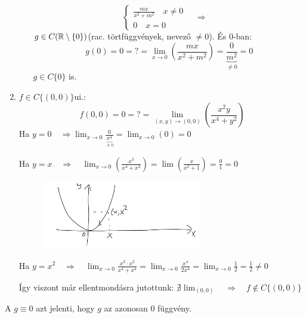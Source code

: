\documentclass[a4paper,11.5pt]{article}
\begin{document}
\begin{task}
\begin{enumerate}
\begin{enumerate}
\[\begin{cases}
					\frac{mx}{x^2+m^2}\quad x\not=0\\
					0\quad x=0
				\end{cases}\quad \Rightarrow\quad   \]
				$g\in C(\mathbb{R}\setminus\{0\})$\quad (rac. törtfüggvények, nevező $\not=0$). És 0-ban:
				\[ g(0)=0=?=\lim_{x\to0}\left(\frac{mx}{x^2+m^2}\right)=\frac{0}{\underbrace{m^2}_{\not=0}}=0 \]
				$g\in C\{0\}$ is.
			\end{enumerate}
			\item $f\in C\{ (0,0) \}$\quad ui.:
			\[ f(0,0)=0=?=\lim_{(x,y)\to(0,0)}\left(\frac{x^2y}{x^4+y^2}\right) \]
			Ha $\displaystyle y=0\quad \Rightarrow\lim_{x\to0}\frac{0}{\underbrace{x^4}_{\not=0}}=\lim_{x\to0}(0)=0$
			
			Ha $\displaystyle y=x\quad \Rightarrow\quad \lim_{x\to0}\left(\frac{x^3}{x^4+x^2}\right)=\lim\left(\frac{x}{x^2+1}\right)=\frac{0}{1}=0$
			
			\begin{figure}[H]
				\centering
				\includegraphics[height=3cm]{kepek/27.png}
				\caption{}
			\end{figure}
			Ha $\displaystyle y = x^2\quad \Rightarrow\quad \lim_{x\to0}\frac{x^2\cdot x^2}{x^4+x^4}=\lim_{x\to0}\frac{x^4}{2x^4}=\lim_{x\to0}\frac{1}{2}=\frac{1}{2}\not=0$
			
			Így viszont már ellentmondásra jutottunk: $\nexists\lim_{(0,0)}\quad \Rightarrow \quad f\notin C\{(0,0)\}$
		\end{enumerate}
		\begin{note}
			A $g\equiv0$ azt jelenti, hogy $g$ az azonosan 0 függvény.
		\end{note}
	\end{task}
\end{document}
